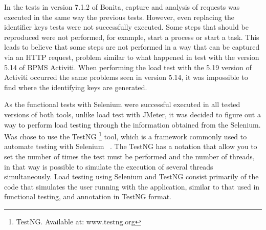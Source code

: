 \documentclass[runningheads,a4paper]{llncs}
\begin{document}
In the tests in version 7.1.2 of Bonita, capture and analysis of requests was executed in the same way the previous tests. However, even replacing the identifier keys tests were not successfully executed. Some steps that should be reproduced were not performed, for example, start a process or start a task. This leads to believe that some steps are not performed in a way that can be captured via an HTTP request, problem similar to what happened in test with the version 5.14 of BPMS Activiti. When performing the load test with the 5.19 version of Activiti occurred the same problems seen in version 5.14, it was impossible to find where the identifying keys are generated.


As the functional tests with Selenium were successful executed in all tested versions of both tools, 
unlike load test with JMeter, it was decided to figure out a way to perform load testing through the information obtained from the Selenium. Was chose to use the TestNG \footnote{TestNG. Available at: www.testng.org} tool, which is a framework commonly used to automate testing with Selenium ~\cite{bindal2014test}. The TestNG has a notation that allow you to set the number of times the test must be performed and the number of threads, in that way is possible to simulate the execution of several threads simultaneously. Load testing using Selenium and TestNG consist primarily of the code that simulates the user running with the application, similar to that used in functional testing, and annotation in TestNG format.
\end{document}
